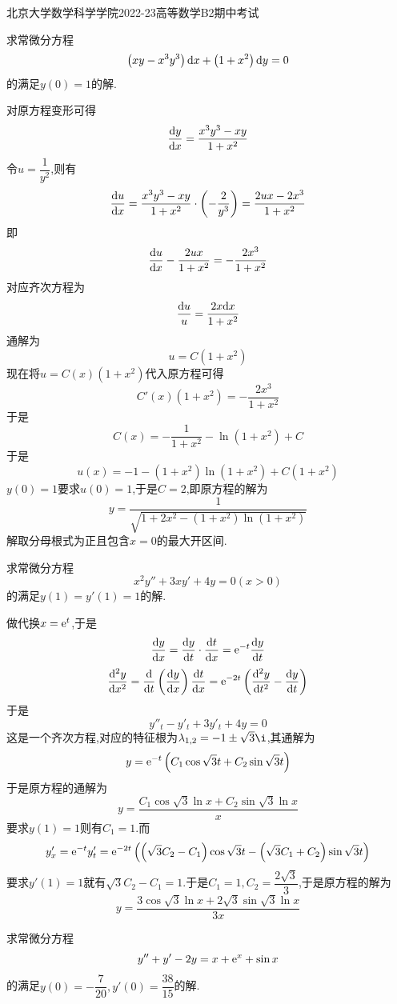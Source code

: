 \documentclass{ctexart}
\begin{document}
\pagestyle{empty}
\begin{center}\Large
    北京大学数学科学学院2022-23高等数学B2期中考试
\end{center}
\begin{problem}[1.(10\songti{分})]
    求常微分方程
    \[\left(xy-x^3y^3\right)\mathrm{d} x+\left(1+x^2\right)\mathrm{d} y=0\]
    的满足$y(0)=1$的解.
\end{problem}
\begin{solution}
    对原方程变形可得
    \[\dfrac{\mathrm{d} y}{\mathrm{d} x}=\dfrac{x^3y^3-xy}{1+x^2}\]
    令$u=\dfrac{1}{y^2}$,则有
    \[\dfrac{\mathrm{d} u}{\mathrm{d} x}=\dfrac{x^3y^3-xy}{1+x^2}\cdot\left(-\dfrac{2}{y^3}\right)=\dfrac{2ux-2x^3}{1+x^2}\]
    即
    \[\dfrac{\mathrm{d} u}{\mathrm{d} x}-\dfrac{2ux}{1+x^2}=-\dfrac{2x^3}{1+x^2}\]
    对应齐次方程为
    \[\dfrac{\mathrm{d} u}{u}=\dfrac{2x\mathrm{d} x}{1+x^2}\]
    通解为
    \[u=C(1+x^2)\]
    现在将$u=C(x)\left(1+x^2\right)$代入原方程可得
    \[C'(x)\left(1+x^2\right)=-\dfrac{2x^3}{1+x^2}\]
    于是
    \[C(x)=-\dfrac{1}{1+x^2}-\ln(1+x^2)+C\]
    于是
    \[u(x)=-1-\left(1+x^2\right)\ln(1+x^2)+C\left(1+x^2\right)\]
    $y(0)=1$要求$u(0)=1$,于是$C=2$,即原方程的解为
    \[y=\dfrac{1}{\sqrt{1+2x^2-\left(1+x^2\right)\ln\left(1+x^2\right)}}\]
    解取分母根式为正且包含$x=0$的最大开区间.
\end{solution}
\begin{problem}[2.(10\songti{分})]
    求常微分方程
    \[x^2y''+3xy'+4y=0(x>0)\]
    的满足$y(1)=y'(1)=1$的解.
\end{problem}
\begin{solution}
    做代换$x=\mathrm{e}^t$,于是
    \[\dfrac{\mathrm{d} y}{\mathrm{d} x}=\dfrac{\mathrm{d} y}{\mathrm{d} t}\cdot\dfrac{\mathrm{d} t}{\mathrm{d} x}=\mathrm{e}^{-t}\dfrac{\mathrm{d} y}{\mathrm{d} t}\]
    \[\dfrac{\mathrm{d}^2y}{\mathrm{d} x^2}=\dfrac{\mathrm{d}}{\mathrm{d} t}\left(\dfrac{\mathrm{d} y}{\mathrm{d} x}\right)\dfrac{\mathrm{d} t}{\mathrm{d} x}=\mathrm{e}^{-2t}\left(\dfrac{\mathrm{d}^2y}{\mathrm{d} t^2}-\dfrac{\mathrm{d} y}{\mathrm{d} t}\right)\]
    于是
    \[y''_t-y'_t+3y'_t+4y=0\]
    这是一个齐次方程,对应的特征根为$\lambda_{1,2}=-1\pm\sqrt3\i$,其通解为
    \[y=\mathrm{e}^{-t}\left(C_1\cos\sqrt3t+C_2\sin\sqrt3t\right)\]
    于是原方程的通解为
    \[y=\dfrac{C_1\cos\sqrt3\ln x+C_2\sin\sqrt3\ln x}{x}\]
    要求$y(1)=1$则有$C_1=1$.而
    \[y'_x=\mathrm{e}^{-t}y'_t=\mathrm{e}^{-2t}\left(\left(\sqrt3C_2-C_1\right)\cos\sqrt3t-\left(\sqrt3C_1+C_2\right)\sin\sqrt3t\right)\]
    要求$y'(1)=1$就有$\sqrt3C_2-C_1=1$.于是$C_1=1,C_2=\dfrac{2\sqrt3}{3}$,于是原方程的解为
    \[y=\dfrac{3\cos\sqrt3\ln x+2\sqrt{3}\sin\sqrt3\ln x}{3x}\]
\end{solution}
\begin{problem}[3.(10\songti{分})]
    求常微分方程
    \[y''+y'-2y=x+\mathrm{e}^x+\sin x\]
    的满足$y(0)=-\dfrac{7}{20},y'(0)=\dfrac{38}{15}$的解.
\end{problem}
\end{document}
